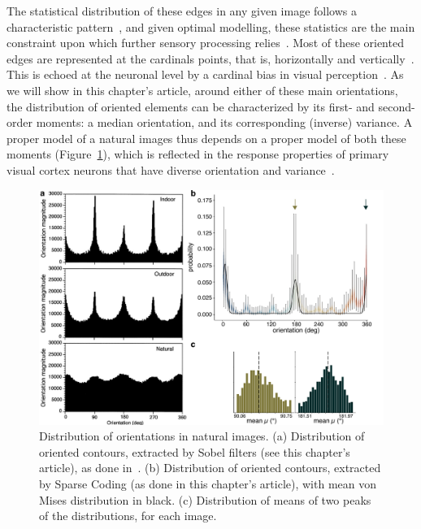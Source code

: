 The statistical distribution of these edges in any given image follows a characteristic pattern~\cite{perrinet2015edge}, and given optimal modelling, these statistics are the main constraint upon which further sensory processing relies~\cite{olshausen1997sparse}. Most of these oriented edges are represented at the cardinals points, that is, horizontally and vertically~\cite{coppola1998distribution}. This is echoed at the neuronal level by a cardinal bias in visual perception~\cite{hansen2004horizontal}. As we will show in this chapter's article, around either of these main orientations, the distribution of oriented elements can be characterized by its first- and second-order moments: a median orientation, and its corresponding (inverse) variance. A proper model of a natural images thus depends on a proper model of both these moments (Figure~\ref{fig_chap3_ori_distrib}), which is reflected in the response properties of primary visual cortex neurons that have diverse orientation and variance~\cite{hubel1962receptive}. 

\begin{figure}[h!tbp]
\vspace{0.1cm}
\centering
\includegraphics[width=1.\textwidth]{fig/chap3_ori_distrib.pdf}
\caption[Distribution of orientations in natural images.]{Distribution of orientations in natural images.
(a) Distribution of oriented contours, extracted by Sobel filters (see this chapter's article), as done in~\cite{coppola1998distribution}. 
(b) Distribution of oriented contours, extracted by Sparse Coding (as done in this chapter's article), with mean von Mises distribution in black. 
(c) Distribution of means of two peaks of the distributions, for each image.}
\label{fig_chap3_ori_distrib}
\end{figure}

